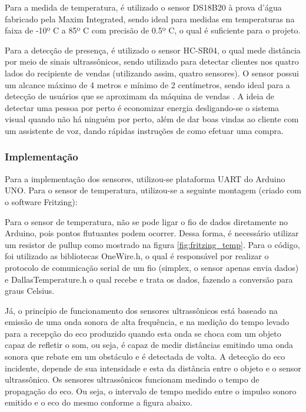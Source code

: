 Para a medida de temperatura, é utilizado o sensor DS18B20 à prova d'água fabricado pela Maxim Integrated, sendo ideal para medidas em temperaturas na faixa de -10º C a 85º C com precisão de 0.5º C, o qual é suficiente para o projeto.

Para a detecção de presença, é utilizado o sensor HC-SR04, o qual mede distância por meio de sinais ultrassônicos, sendo utilizado para detectar clientes nos quatro lados do recipiente de vendas (utilizando assim, quatro sensores). O sensor possui um alcance máximo de 4 metros e mínimo de 2 centímetros, sendo ideal para a detecção de usuários que se aproximam da máquina de vendas \cite{mq3}. A ideia de detectar uma pessoa por perto é economizar energia desligando-se o sistema visual quando não há ninguém por perto, além de dar boas vindas ao cliente com um assistente de voz, dando rápidas instruções de como efetuar uma compra.

\subsubsection{Implementação}

Para a implementação dos sensores, utilizou-se plataforma UART do Arduino UNO. Para o sensor de temperatura, utilizou-se a seguinte montagem (criado com o software Fritzing):

Para o sensor de temperatura, não se pode ligar o fio de dados diretamente no Arduino, pois pontos flutuantes podem ocorrer. Dessa forma, é necessário utilizar um resistor de pullup como mostrado na figura \ref{fig:fritzing_temp}. Para o código, foi utilizado as bibliotecas OneWire.h, o qual é responsável por realizar o protocolo de comunicação serial de um fio (simplex, o sensor apenas envia dados) e DallasTemperature.h o qual recebe e trata os dados, fazendo a conversão para graus Celsius.

Já, o princípio de funcionamento dos sensores ultrassônicos está baseado na emissão de uma onda sonora de alta frequência, e na medição do tempo levado para a recepção do eco produzido quando esta onda se choca com um objeto capaz de refletir o som, ou seja, é capaz de medir distâncias emitindo uma onda sonora que rebate em um obstáculo e é detectada de volta. A detecção do eco incidente, depende de sua intensidade e esta da distância entre o objeto e o sensor ultrassônico. Os sensores ultrassônicos funcionam medindo o tempo de propagação do eco. Ou seja, o intervalo de tempo medido entre o impulso sonoro emitido e o eco do
mesmo conforme a figura abaixo.

